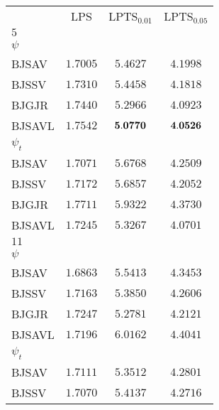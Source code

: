 \documentclass[12pt]{article}
\title{}
\author{}
\date{}
\theoremstyle{plain}
\numberwithin{equation}{section}
\begin{document}
\maketitle



\begin{table}[h!]
\begin{center}
\begin{small}\begin{tabular}{ l c c c }
\hline\hline
{}&{LPS}&{LPTS$_{0.01}$}&{LPTS$_{0.05}$}\\
{$5$} &{}&{}&{}\\
{$\psi$} \\
 {BJSAV}&     $1.7005$             &     $5.4627$            &     $4.1998$       \\
{BJSSV}&     $1.7310$              &     $5.4458$             &     $4.1818$       \\
{BJGJR}&     $1.7440$              &     $5.2966$             &     $4.0923$        \\
{BJSAVL}&   $1.7542$              &     ${\bf{5.0770}}$    &     ${\bf{4.0526}}$\\
{$\psi_t$} \\
 {BJSAV}&     $1.7071$             &     $5.6768$             &     $4.2509$      \\
{BJSSV}&     $1.7172$              &     $5.6857$             &     $4.2052$      \\
{BJGJR}&     $1.7711$              &     $5.9322$             &     $4.3730$      \\
{BJSAVL}&   $1.7245$              &     $5.3267$             &     $4.0701$      \\\hline
{$11$} &{}&{}&{}\\
{$\psi$} \\
 {BJSAV}&     $1.6863$             &     $5.5413$            &     $4.3453$      \\
{BJSSV}&      $1.7163$             &      $5.3850$            &     $4.2606$      \\
{BJGJR}&     $1.7247$              &     $5.2781$             &     $4.2121$      \\
{BJSAVL}&   $1.7196$              &     $6.0162$             &     $4.4041$      \\
{$\psi_t$} \\
 {BJSAV}&     $1.7111$             &     $5.3512$             &     $4.2801$      \\
{BJSSV}&     $1.7070$             &     $5.4137$             &     $4.2716$      \\

\end{tabular}
\end{small}
\end{center}
\end{table}
\end{document}

